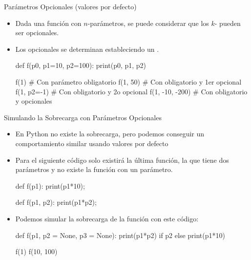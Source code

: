 \documentclass[10pt,envcountsect,spanish]{beamer}
\begin{document}
\begin{frame}[fragile]{Parámetros Opcionales (valores por defecto)} 

\begin{itemize}
\item Dada una función con $n$-parámetros, se puede considerar que los $k$- pueden ser opcionales. 
\item Los opcionales se determinan estableciendo un . 

\begin{pyconsole}[][frame=single]
def f(p0, p1=10, p2=100):
    print(p0, p1, p2)

f(1)            # Con parámetro obligatorio
f(1, 50)        # Con obligatorio y 1er opcional
f(1, p2=-1)     # Con obligatorio y  2o opcional
f(1, -10, -200) # Con obligatorio y  opcionales
\end{pyconsole}

\end{itemize}

\end{frame}



\begin{frame}[fragile]{Simulando la Sobrecarga con Parámetros Opcionales}

\begin{itemize}
\item En Python no existe la sobrecarga, pero podemos conseguir un comportamiento similar usando valores por defecto

\item Para  el siguiente código solo existirá la última función, la que tiene dos parámetros y no existe la función con un parámetro.

{\small 
\begin{pyverbatim}[][frame=single]
def f(p1):
    print(p1*10);
 
def f(p1, p2):
    print(p1*p2);
\end{pyverbatim}
}

\item Podemos simular la sobrecarga de la función con este código:

{\small 
\begin{pyconsole}[][frame=single]
def f(p1, p2 = None, p3 = None):
    print(p1*p2) if p2 else print(p1*10)

f(1)
f(10, 100)
\end{pyconsole}
}
\end{itemize}

\end{frame}
\end{document}
